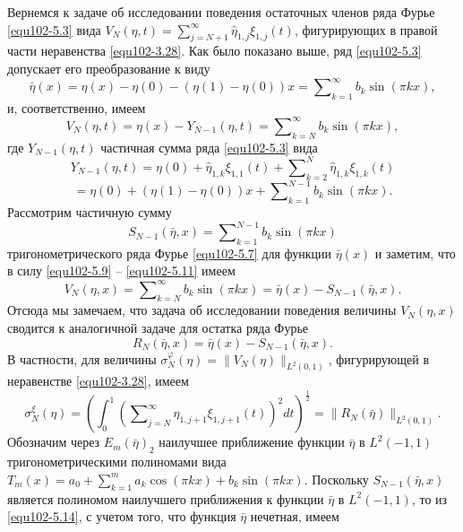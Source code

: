 Вернемся к задаче об исследовании поведения остаточных членов ряда Фурье \eqref{equ102-5.3}  вида $V_N(\eta,t)=\sum\nolimits_{j=N+1}^\infty \hat \eta_{1,j}\xi_{1,j}(t)$, фигурирующих в правой части неравенства \eqref{equ102-3.28}. Как было показано выше, ряд \eqref{equ102-5.3} допускает его преобразование к виду 
\begin{equation}\label{equ102-5.7}
\bar\eta(x)=\eta(x)-\eta(0)-(\eta(1)-\eta(0))x= \sum\nolimits_{k=1}^\infty b_k\sin(\pi kx),
\end{equation}
и, соответственно, имеем
\begin{equation}\label{equ102-5.9}
V_N(\eta,t)=\eta(x)-Y_{N-1}(\eta,t)= \sum\nolimits_{k=N}^\infty b_k\sin(\pi kx),
\end{equation}
где  $Y_{N-1}(\eta,t)$ частичная сумма ряда \eqref{equ102-5.3} вида
$$
Y_{N-1}(\eta,t)= \eta(0)+\hat\eta_{1,k}\xi_{1,1}(t)+ \sum\nolimits_{k=2}^N \hat \eta_{1,k}\xi_{1,k}(t)
$$
\begin{equation}\label{equ102-5.10}
= \eta(0)+(\eta(1)-\eta(0))x+\sum\nolimits_{k=1}^{N-1} b_k\sin(\pi kx).
\end{equation}
Рассмотрим частичную сумму
\begin{equation}\label{equ102-5.11}
S_{N-1}(\bar\eta,x)= \sum\nolimits_{k=1}^{N-1} b_k\sin(\pi kx)
\end{equation}
тригонометрического ряда Фурье \eqref{equ102-5.7} для функции $\bar\eta(x)$ и заметим, что в силу \eqref{equ102-5.9} -- \eqref{equ102-5.11} имеем
\begin{equation}\label{equ102-5.12}
V_N(\eta,x)= \sum\nolimits_{k=N}^{\infty} b_k\sin(\pi kx)=\bar\eta(x)-S_{N-1}(\bar\eta,x).
\end{equation}
Отсюда мы замечаем, что задача об исследовании поведения величины $V_N(\eta,x)$ сводится к аналогичной задаче для остатка ряда Фурье
\begin{equation}\label{equ102-5.13}
R_N(\bar\eta,x)= \bar\eta(x)-S_{N-1}(\bar\eta,x).
\end{equation}
В частности, для величины $\sigma_N^\varphi(\eta)=\|V_N(\eta)\|_{L^2(0,1)}$, фигурирующей в неравенстве \eqref{equ102-3.28}, имеем
\begin{equation}\label{equ102-5.14}
\sigma_N^\xi(\eta)=\left(\int_{0}^1\left(\sum\nolimits_{j=N}^\infty \hat \eta_{1,j+1}\xi_{1,j+1}(t)\right)^2 dt\right)^\frac12=\|R_N(\bar\eta)\|_{L^2(0,1)}.
\end{equation}
Обозначим через $E_m(\bar\eta)_2$ наилучшее приближение функции $\bar\eta$ в $L^2(-1,1)$ тригонометрическими полиномами вида $T_m(x)=a_0+\sum_{k=1}^{m}a_k\cos(\pi kx)+b_k\sin(\pi kx)$. Поскольку $S_{N-1}(\bar\eta,x)$ является полиномом наилучшего приближения к функции $\bar\eta$ в $L^2(-1,1)$, то из \eqref{equ102-5.14}, с учетом того, что функция $\bar\eta$ нечетная, имеем
